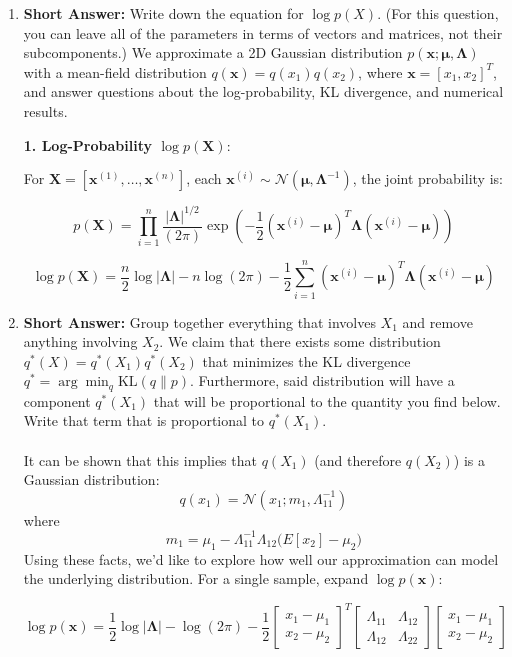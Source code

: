 \documentclass[a3paper,12pt]{extarticle} %
\begin{document}
\begin{enumerate}
    \item \textbf{Short Answer:} Write down the equation for \( \log p(X) \). (For this question, you can leave all of the parameters in terms of vectors and matrices, not their subcomponents.)
    We approximate a 2D Gaussian distribution \(p(\mathbf{x}; \boldsymbol{\mu}, \boldsymbol{\Lambda})\) with a mean-field distribution \(q(\mathbf{x}) = q(x_1) q(x_2)\), where \(\mathbf{x} = [x_1, x_2]^T\), and answer questions about the log-probability, KL divergence, and numerical results.

\textbf{1. Log-Probability \(\log p(\mathbf{X})\)}:

For \(\mathbf{X} = [\mathbf{x}^{(1)}, \dots, \mathbf{x}^{(n)}]\), each \(\mathbf{x}^{(i)} \sim \mathcal{N}(\boldsymbol{\mu}, \boldsymbol{\Lambda}^{-1})\), the joint probability is:

\[
p(\mathbf{X}) = \prod_{i=1}^n \frac{|\boldsymbol{\Lambda}|^{1/2}}{(2\pi)} \exp\left( -\frac{1}{2} (\mathbf{x}^{(i)} - \boldsymbol{\mu})^T \boldsymbol{\Lambda} (\mathbf{x}^{(i)} - \boldsymbol{\mu}) \right)
\]

\[
\log p(\mathbf{X}) = \frac{n}{2} \log |\boldsymbol{\Lambda}| - n \log (2\pi) - \frac{1}{2} \sum_{i=1}^n (\mathbf{x}^{(i)} - \boldsymbol{\mu})^T \boldsymbol{\Lambda} (\mathbf{x}^{(i)} - \boldsymbol{\mu})
\]
    \item \textbf{Short Answer:} Group together everything that involves \( X_1 \) and remove anything involving \( X_2 \). We claim that there exists some distribution \( q^*(X) = q^*(X_1)q^*(X_2) \) that minimizes the KL divergence \( q^* = \arg\min_q \text{KL}(q \| p) \). Furthermore, said distribution will have a component \( q^*(X_1) \) that will be proportional to the quantity you find below. Write that term that is proportional to \( q^*(X_1) \).
    \\\\ It can be shown that this implies that \( q(X_1) \) (and therefore \( q(X_2) \)) is a Gaussian distribution:
    \[
    q(x_1) = \mathcal{N} \left( x_1; m_1, \Lambda_{11}^{-1} \right)
    \]
    where 
    \[
    m_1 = \mu_1 - \Lambda_{11}^{-1} \Lambda_{12} \big(E[x_2] - \mu_2\big)
    \]
    Using these facts, we’d like to explore how well our approximation can model the underlying distribution.
    For a single sample, expand \(\log p(\mathbf{x})\):

\[
\log p(\mathbf{x}) = \frac{1}{2} \log |\boldsymbol{\Lambda}| - \log (2\pi) - \frac{1}{2} \begin{bmatrix} x_1 - \mu_1 \\ x_2 - \mu_2 \end{bmatrix}^T \begin{bmatrix} \Lambda_{11} & \Lambda_{12} \\ \Lambda_{12} & \Lambda_{22} \end{bmatrix} \begin{bmatrix} x_1 - \mu_1 \\ x_2 - \mu_2 \end{bmatrix}
\]


\end{enumerate}
\end{document}
